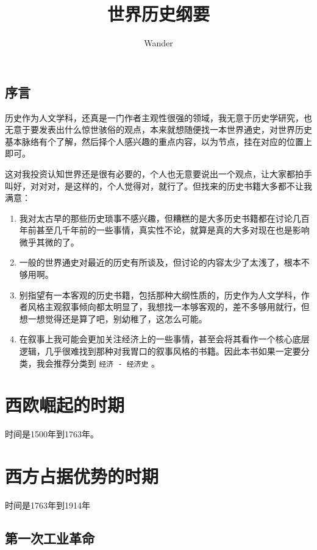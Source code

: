 \documentclass[12pt,oneside]{book}
\title{世界历史纲要}
\author{Wander}
\begin{document}
\makemytitle



\frontmatter 
{}
\chapter*{序言}
历史作为人文学科，还真是一门作者主观性很强的领域，我无意于历史学研究，也无意于要发表出什么惊世骇俗的观点，本来就想随便找一本世界通史，对世界历史基本脉络有个了解，然后择个人感兴趣的重点内容，以为节点，挂在对应的位置上即可。

这对我投资认知世界还是很有必要的，个人也无意要说出一个观点，让大家都拍手叫好，对对对，是这样的，个人觉得对，就行了。但找来的历史书籍大多都不让我满意：

\begin{enumerate}
\item 我对太古早的那些历史琐事不感兴趣，但糟糕的是大多历史书籍都在讨论几百年前甚至几千年前的一些事情，真实性不论，就算是真的大多对现在也是影响微乎其微的了。
\item 一般的世界通史对最近的历史有所谈及，但讨论的内容太少了太浅了，根本不够用啊。
\item 别指望有一本客观的历史书籍，包括那种大纲性质的，历史作为人文学科，作者风格主观叙事倾向都太明显了，我想找一本够客观的，差不多够用就行，但想一想觉得还是算了吧，别幼稚了，这怎么可能。
\item 在叙事上我可能会更加关注经济上的一些事情，甚至会将其看作一个核心底层逻辑，几乎很难找到那种对我胃口的叙事风格的书籍。因此本书如果一定要分类，我会推荐分类到 \verb+经济 - 经济史+ 。
\end{enumerate}





\setcounter{tocdepth}{2}    
\tableofcontents



\mainmatter
\part{西欧崛起的时期}
时间是1500年到1763年。

\part{西方占据优势的时期}
时间是1763年到1914年

\chapter{第一次工业革命}
\end{document}
